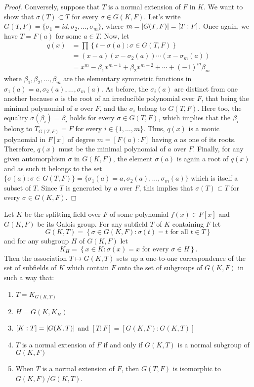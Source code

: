 \begin{proof}
  Conversely, suppose that $T$ is a normal extension of $F$ in $K$. We want to show that ${\sigma(T)}\subset{T}$ for every ${\sigma}\in{G(K,F)}$. Let's write $G(T,F)=\{\sigma_{1}=id,\sigma_{2},\ldots,\sigma_{m}\}$, where $m=\lvert G(T,F)\rvert=[T:F]$. Once again, we have $T=F(a)$ for some ${a}\in{T}$. Now, let
  \begin{align*}
    q(x)
    &=
    \prod\left\{t-\sigma(a):{\sigma}\in{G(T,F)}\right\}
    \\
    &=
    (x-a)(x-\sigma_{2}(a))\cdots(x-\sigma_{m}(a))
    \\
    &=
    x^{m}-\beta_{1}x^{m-1}+\beta_{2}x^{m-2}+\cdots+(-1)^{m}\beta_{m}
  \end{align*}
  where $\beta_{1},\beta_{2},\ldots,\beta_{m}$ are the elementary symmetric functions in $\sigma_{1}(a)=a,\sigma_{2}(a),\ldots,\sigma_{m}(a)$. As before, the $\sigma_{i}(a)$ are distinct from one another because $a$ is the root of an irreducible polynomial over $F$, that being the minimal polynomial of $a$ over $F$, and the $\sigma_{i}$ belong to $G(T,F)$. Here too, the equality $\sigma(\beta_{i})=\beta_{i}$ holds for every ${\sigma}\in{G(T,F)}$, which implies that the $\beta_{i}$ belong to $T_{G(T,F)}=F$ for every ${i}\in{\{1,\ldots,m\}}$. Thus, $q(x)$ is a monic polynomial in $F[x]$ of degree $m=[F(a):F]$ having $a$ as one of its roots. Therefore, $q(x)$ must be the minimal polynomial of $a$ over $F$. Finally, for any given automorphism $\sigma$ in $G(K,F)$, the element $\sigma(a)$ is again a root of $q(x)$ and as such it belongs to the set ${\{\sigma(a):{\sigma}\in{G(T,F)}\}}=\{\sigma_{1}(a)=a,\sigma_{2}(a),\ldots,\sigma_{m}(a)\}$ which is itself a subset of $T$. Since $T$ is generated by $a$ over $F$, this implies that ${\sigma(T)}\subset{T}$ for every ${\sigma}\in{G(K,F)}$.
\end{proof}

\begin{theorem}\label{thm:galois-correspondence}
	Let $K$ be the splitting field over $F$ of some polynomial ${f(x)}\in{F[x]}$
	and $G(K,F)$ be its Galois group. For any subfield $T$ of $K$ containing $F$
	let
	\[
		G(K,T)=\left\{{\sigma}\in{G(K,F)}:\sigma(t)=t\text{ for all }{t}\in{T}\right\}
	\]
	and for any subgroup $H$ of $G(K,F)$ let
	\[
		K_{H}=\left\{{x}\in{K}:\sigma(x)=x\text{ for every }{\sigma}\in{H}\right\}.
	\]
	Then the association ${T}\mapsto{G(K,T)}$ sets up a one-to-one correspondence
	of the set of subfields of $K$ which contain $F$ onto the set of subgroups of
	$G(K,F)$ in such a way that:
	\begin{enumerate}
		\item $T=K_{G(K,T)}$
		\item $H=G(K,K_{H})$
		\item $[K:T]=\lvert G(K,T)\rvert$ and $[T:F]=[G(K,F):G(K,T)]$
		\item $T$ is a normal extension of $F$ if and only if $G(K,T)$ is a normal
		      subgroup of $G(K,F)$
		\item When $T$ is a normal extension of $F$, then $G(T,F)$ is isomorphic to
		      $G(K,F)/G(K,T)$.
	\end{enumerate}
\end{theorem}

